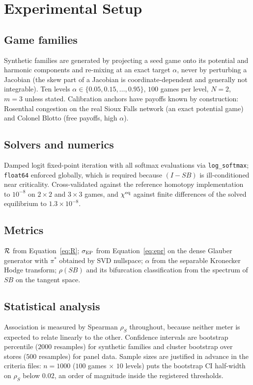 \section{Experimental Setup}
\label{sec:setup}

\subsection{Game families}
Synthetic families are generated by projecting a seed game onto its potential and harmonic
components and re-mixing at an exact target $\alpha$, never by perturbing a Jacobian (the
skew part of a Jacobian is coordinate-dependent and generally not integrable). Ten levels
$\alpha\in\{0.05,0.15,\dots,0.95\}$, $100$ games per level, $N=2$, $m=3$ unless stated.
Calibration anchors have payoffs known by construction: Rosenthal congestion on the real
Sioux Falls network (an exact potential game) and Colonel Blotto (free payoffs, high
$\alpha$).

\subsection{Solvers and numerics}
Damped logit fixed-point iteration with all softmax evaluations via \texttt{log\_softmax};
\texttt{float64} enforced globally, which is required because $(I-SB)$ is ill-conditioned
near criticality. Cross-validated against the reference homotopy
implementation~\cite{gambit} to $10^{-8}$ on $2\times2$ and $3\times3$ games, and
$\chi^{\mathrm{eq}}$ against finite differences of the solved equilibrium to $1.3\times10^{-8}$.

\subsection{Metrics}
$\mathcal{R}$ from Equation~\eqref{eq:R}; $\sigma_{\mathrm{EP}}$ from Equation~\eqref{eq:epr} on the dense Glauber
generator with $\pi^*$ obtained by SVD nullspace; $\alpha$ from the separable Kronecker
Hodge transform; $\rho(SB)$ and its bifurcation classification from the spectrum of $SB$ on
the tangent space.

\subsection{Statistical analysis}
Association is measured by Spearman $\rho_S$ throughout, because neither meter is expected
to relate linearly to the other. Confidence intervals are bootstrap percentile
($2000$ resamples) for synthetic families and cluster bootstrap over stores
($500$ resamples) for panel data. Sample sizes are justified in advance in the criteria
files: $n=1000$ ($100$ games $\times$ $10$ levels) puts the bootstrap CI half-width on
$\rho_S$ below $0.02$, an order of magnitude inside the registered thresholds.


